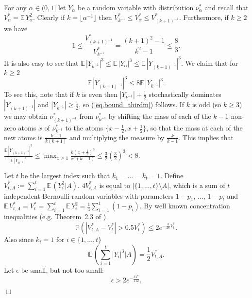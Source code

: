 \documentclass{article}
\newenvironment{proofof}[1]{\noindent {\bf Proof of #1}}{\hspace*{\fill}$\Box$}
\def\E{{\mathbb E}\,}
\newcommand{\pr}{\mathbb P}
\newcommand\nuopt[1]{\nu_{#1}^*}
\begin{document}
\begin{proofof}{Lemma~\ref{lem.clt}}
    For any $\alpha \in (0,1]$ let $Y_{\alpha}$ be a random variable with distribution $\nuopt{\alpha}$ and recall that $V_{\alpha}^* = \E Y_{\alpha}^2$.
    Clearly if $k=\lfloor \alpha^{-1} \rfloor$ then
    ${V_{k^{-1}}^*} \le V_{\alpha}^* \le {V_{(k+1)^{-1}}^*}$.
Furthermore, if $k \ge 2$ we have
    \begin{equation}\label{eq.bound_var}
        1 \le \frac {V_{(k+1)^{-1}}^*}{V_{k^{-1}}^*} = \frac { (k+1)^2 - 1} {k^2 - 1} \le \frac 8 3.
    \end{equation}
    It is also easy to see that $\E |Y_{k^{-1}}|^3 \le \E |Y_{\alpha}|^3 \le \E |Y_{(k+1)^{-1}}|^3$.
    We claim that for $k \ge 2$
    \begin{equation}\label{eq.bound_thirdm}
         \E |Y_{(k+1)^{-1}}|^3 \le 8 \E |Y_{k^{-1}}|^3.
    \end{equation}
To see this, note that if $k$ is even 
then  $|Y_{k^{-1}}| + \frac 1 2$ stochastically dominates $|Y_{(k+1)^{-1}}|$ and $|Y_{k^{-1}}| \ge \frac 1 2$,
    so (\ref{eq.bound_thirdm}) follows. If $k$ is odd (so $k \ge 3$) we may obtain $\nuopt {(k+1)^{-1}}$ from $\nuopt {k^{-1}}$ by shifting the mass of each of the $k-1$ non-zero atoms $x$ of $\nuopt {k^{-1}}$ to the atoms $\{x-\frac 1 2, x+\frac 1 2\}$, so that the mass at each of the new atoms is $\frac {k-1} {k(k+1)}$
and multiplying the measure by $\frac k {k-1}$. This implies that $\frac {  \E |Y_{(k+1)^{-1}}|^3 } {  \E |Y_{k^{-1}}|^3  } \le \max_{x \ge 1} \frac {k {(x + \frac 1 2)^3}} {x^3(k-1)}
    \le \frac 3 2 (\frac 3 2)^3<8$. 

    Let $t$ be the largest index such that $k_1= \dots = k_t = 1$. 
    Define $V_{t,A}^* := \sum_{i=1}^t \E (Y_i^2 | A)$. 
    $4 V_{t, A}^*$ is equal to $|\{1, \dots, t\} \setminus A|$, which is a sum of $t$ independent Bernoulli random variables with parameters $1-p_1$, $\dots$, $1-p_t$ and 
    $\E V_{t,A}^* = V_{t}^* = \sum_{i=1}^t \E Y_i^2 = \frac 1 4 \sum_{i=1}^t (1-p_i)$. By well known concentration inequalities (e.g. Theorem~2.3 of \cite{cmcd98})
    \begin{equation}\label{eq.conc}
        \pr(|V_{t,A}^* - V_{t}^*|  > 0.5 V_{t}^*) \le 2 e^{-\frac 3 {28} V_{t}^*}.
    \end{equation}
    Also since $k_i=1$ for $i \in \{1, \dots, t\}$
    \begin{equation}\label{eq.bound_thirdmc}
       \E(\sum_{i=1}^t |Y_i|^3 | A) =  \frac 1 2 V_{t,A}^*.
    \end{equation}
    Let $\epsilon$ be small, but not too small:
    \begin{equation}\label{eq.epsilon_not_too_small}
        \epsilon > 2 e^{-\frac {3 V^*} {112}}.
    \end{equation}



\end{proofof}
\end{document}
